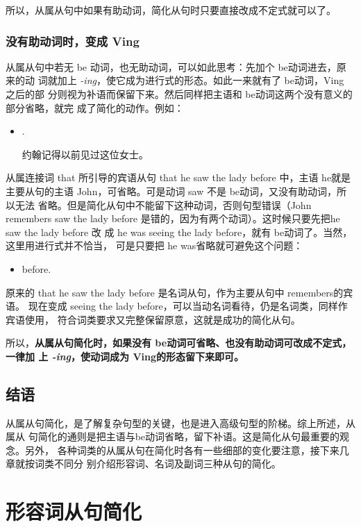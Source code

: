 所以，从属从句中如果有助动词，简化从句时只要直接改成不定式就可以了。

\subsection{没有助动词时，变成 Ving}
\label{subsec:toing}

从属从句中若无 be 动词，也无助动词，可以如此思考：先加个 be动词进去，原来的动
词就加上 \emph{-ing}，使它成为进行式的形态。如此一来就有了 be动词，Ving 之后的部
分则视为补语而保留下来。然后同样把主语和 be动词这两个没有意义的部分省略，就完
成了简化的动作。例如：
\begin{itemize}
\item {}   .

  约翰记得以前见过这位女士。
\end{itemize}

从属连接词 that 所引导的宾语从句 that he saw the lady before 中，主语 he就是
主要从句的主语 John，可省略。可是动词 saw 不是 be动词，又没有助动词，所以无法
省略。但是简化从句中不能留下这种动词，否则句型错误（John remembers saw the
lady before 是错的，因为有两个动词）。这时候只要先把he saw the lady before 改
成 he was seeing the lady before，就有 be动词了。当然，这里用进行式并不恰当，
可是只要把 he was省略就可避免这个问题：
\begin{itemize}
\item {}   before.
\end{itemize}
原来的 that he saw the lady before 是名词从句，作为主要从句中 remembers的宾语。
现在变成 seeing the lady before，可以当动名词看待，仍是名词类，同样作宾语使用，
符合词类要求又完整保留原意，这就是成功的简化从句。

所以，\textbf{从属从句简化时，如果没有 be动词可省略、也没有助动词可改成不定式，一律加
上 \emph{-ing}，使动词成为 Ving的形态留下来即可。}

\section{结语}

从属从句简化，是了解复杂句型的关键，也是进入高级句型的阶梯。综上所述，从属从
句简化的通则是把主语与be动词省略，留下补语。这是简化从句最重要的观念。另外，
各种词类的从属从句在简化时各有一些细部的变化要注意，接下来几章就按词类不同分
别介绍形容词、名词及副词三种从句的简化。

\chapter{形容词从句简化}

